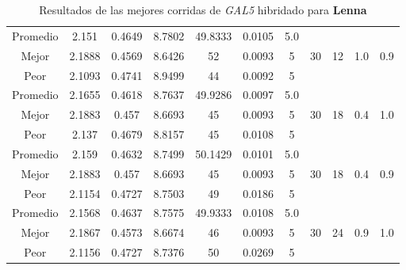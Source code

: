 \begin{table}[h!]
\begin{center}
\begin{tabular}{|c|c|c|c|c|c|c|c|c|c|c|}
        \hline
        \hline
            Promedio  & 2.151 & 0.4649 & 8.7802 & 49.8333 & 0.0105 & 5.0 &  &  &  & \\
            \cline{1-7}
            Mejor & 2.1888 & 0.4569  & 8.6426 & 52 & 0.0093 & 5 & 30 & 12 & 1.0 & 0.9\\
            \cline{1-7}
            Peor & 2.1093 & 0.4741  & 8.9499 & 44 & 0.0092 & 5 &  &  &  & \\
        \hline
        \hline
            Promedio  & 2.1655 & 0.4618 & 8.7637 & 49.9286 & 0.0097 & 5.0 &  &  &  & \\
            \cline{1-7}
            Mejor & 2.1883 & 0.457  & 8.6693 & 45 & 0.0093 & 5 & 30 & 18 & 0.4 & 1.0\\
            \cline{1-7}
            Peor & 2.137 & 0.4679  & 8.8157 & 45 & 0.0108 & 5 &  &  &  & \\
        \hline
        \hline
            Promedio  & 2.159 & 0.4632 & 8.7499 & 50.1429 & 0.0101 & 5.0 &  &  &  & \\
            \cline{1-7}
            Mejor & 2.1883 & 0.457  & 8.6693 & 45 & 0.0093 & 5 & 30 & 18 & 0.4 & 0.9\\
            \cline{1-7}
            Peor & 2.1154 & 0.4727  & 8.7503 & 49 & 0.0186 & 5 &  &  &  & \\
        \hline
        \hline
            Promedio  & 2.1568 & 0.4637 & 8.7575 & 49.9333 & 0.0108 & 5.0 &  &  &  & \\
            \cline{1-7}
            Mejor & 2.1867 & 0.4573  & 8.6674 & 46 & 0.0093 & 5 & 30 & 24 & 0.9 & 1.0\\
            \cline{1-7}
            Peor & 2.1156 & 0.4727  & 8.7376 & 50 & 0.0269 & 5 &  &  &  & \\
        \hline
        \end{tabular}
        \caption{Resultados de las mejores corridas de \emph{GAL5} hibridado para {\bf Lenna}}
        \label{tb:tableGAL5}
    \end{center}
\end{table}
